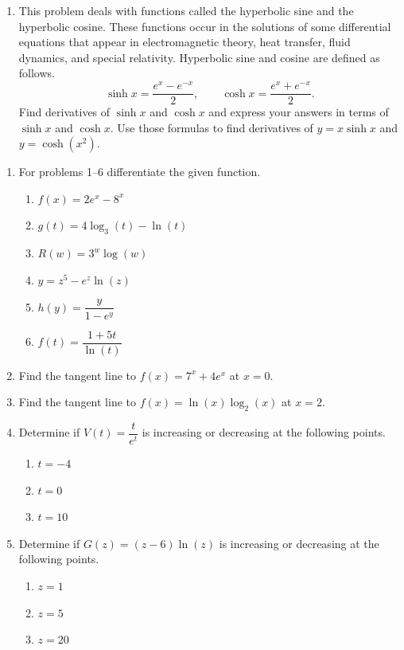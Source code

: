 \begin{enumerate}
\item This problem deals with functions called the hyperbolic sine and the hyperbolic cosine. These functions occur in the solutions of some differential equations that appear in electromagnetic theory, heat transfer, fluid dynamics, and special relativity. Hyperbolic sine and cosine are defined as follows.
  \[
  \sinh x=\frac{e^{x}-e^{-x}}{2}, \qquad \cosh x=\frac{e^{x}+e^{-x}}{2}.
  \]
  Find derivatives of $\sinh x$ and $\cosh x$ and express your answers in terms of $\sinh x$ and $\cosh x$. Use those formulas to find derivatives of $y=x\sinh x$ and $y=\cosh\left(x^{2}\right)$.
\end{enumerate}


\begin{enumerate}
\item For problems 1--6 differentiate the given function.
  \begin{enumerate}
    \item $f(x)=2e^x-8^x$ 
    \item $g(t)=4\log_{3}(t)-\ln(t)$ 
    \item $R(w)=3^w\log(w)$ 
    \item $y=z^5-e^z\ln(z)$ 
    \item $h(y)=\dfrac{y}{1-e^y}$ 
    \item $f(t)=\dfrac{1+5t}{\ln(t)}$ 
  \end{enumerate}

\item Find the tangent line to $f(x)=7^x+4e^x$ at $x=0$. 

\item Find the tangent line to $f(x)=\ln(x)\log_{2}(x)$ at $x=2$. 

\item Determine if $V(t)=\dfrac{t}{e^t}$ is increasing or decreasing at the following points.
  \begin{enumerate}
    \item $t=-4$ 
    \item $t=0$ 
    \item $t=10$ 
  \end{enumerate}

\item Determine if $G(z)=(z-6)\ln(z)$ is increasing or decreasing at the following points.
  \begin{enumerate}
    \item $z=1$ 
    \item $z=5$ 
    \item $z=20$ 
  \end{enumerate}
\end{enumerate}


